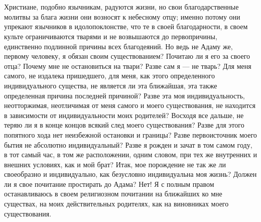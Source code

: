 \documentclass[12pt,oneside]{book}
\begin{document}
\chapter{}

Христиане, подобно язычникам, радуются жизни, но свои благодарственные молитвы за блага жизни они возносят к небесному отцу; именно потому они упрекают язычников в идолопоклонстве, что те в своей благодарности, в своем культе ограничиваются тварями и не возвышаются до первопричины, единственно подлинной причины всех благодеяний. Но ведь не Адаму же, первому человеку, я обязан своим существованием? Почитаю ли я его за своего отца? Почему мне не остановиться на твари? Разве сам я --- не тварь? Для меня самого, не издалека пришедшего, для меня, как этого определенного индивидуального существа, не является ли эта ближайшая, эта также определенная причина последней причиной? Разве эта моя индивидуальность, неотторжимая, неотличимая от меня самого и моего существования, не находится в зависимости от индивидуальности моих родителей? Восходя все дальше, не теряю ли я в конце концов всякий след моего существования? Разве для этого попятного хода нет неизбежной остановки и границы? Разве первоисточник моего бытия не абсолютно индивидуальный? Разве я рожден и зачат в том самом году, в тот самый час, в том же расположении, одним словом, при тех же внутренних и внешних условиях, как и мой брат? Итак, мое порождение не так же ли своеобразно и индивидуально, как безусловно индивидуальна моя жизнь? Должен ли я свое почитание простирать до Адама? Нет! Я с полным правом останавливаюсь в своем религиозном почитании на ближайших ко мне существах, на моих действительных родителях, как на виновниках моего существования.



\chapter{}
\end{document}
